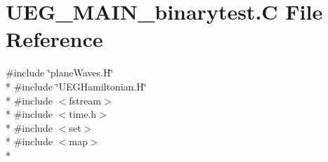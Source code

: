 \hypertarget{UEG__MAIN__binarytest_8C}{\section{U\-E\-G\-\_\-\-M\-A\-I\-N\-\_\-binarytest.\-C File Reference}
\label{UEG__MAIN__binarytest_8C}
}
{\ttfamily \#include \char`\"{}plane\-Waves.\-H\char`\"{}}\\*
{\ttfamily \#include \char`\"{}U\-E\-G\-Hamiltonian.\-H\char`\"{}}\\*
{\ttfamily \#include $<$fstream$>$}\\*
{\ttfamily \#include $<$time.\-h$>$}\\*
{\ttfamily \#include $<$set$>$}\\*
{\ttfamily \#include $<$map$>$}\\*
